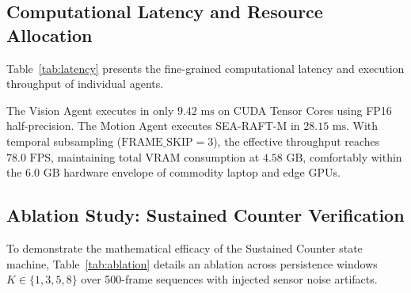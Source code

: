 \documentclass[conference]{IEEEtran}
\begin{document}
\subsection{Computational Latency and Resource Allocation}
Table~\ref{tab:latency} presents the fine-grained computational latency and execution throughput of individual agents.

\begin{table}[htbp]
\caption{Computational Latency and Resource Allocation Across Multi-Agent Architecture (NVIDIA RTX 4050 6GB)}
\label{tab:latency}
\centering
{}
\end{table}

The Vision Agent executes in only $9.42\text{ ms}$ on CUDA Tensor Cores using FP16 half-precision. The Motion Agent executes SEA-RAFT-M in $28.15\text{ ms}$. With temporal subsampling ($\text{FRAME\_SKIP}=3$), the effective throughput reaches $78.0\text{ FPS}$, maintaining total VRAM consumption at $4.58\text{ GB}$, comfortably within the $6.0\text{ GB}$ hardware envelope of commodity laptop and edge GPUs.

\subsection{Ablation Study: Sustained Counter Verification}
To demonstrate the mathematical efficacy of the Sustained Counter state machine, Table~\ref{tab:ablation} details an ablation across persistence windows $K \in \{1, 3, 5, 8\}$ over 500-frame sequences with injected sensor noise artifacts.
\end{document}
